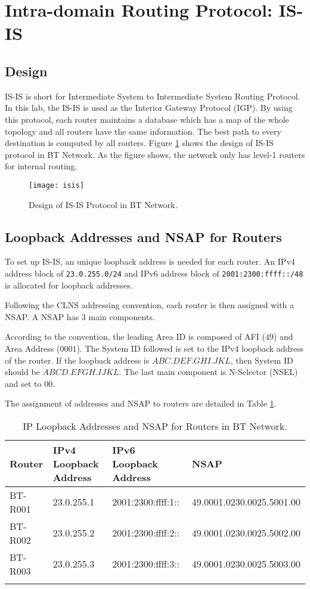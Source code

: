 \section{Intra-domain Routing Protocol: IS-IS}
\label{sec:isis}

\subsection{Design}

IS-IS is short for Intermediate System to Intermediate System Routing Protocol. In this lab, the IS-IS is used as the Interior Gateway Protocol (IGP). 
By using this protocol, each router maintains a database which has a map of the whole topology and all routers have the same information. The best path to every destination is computed by all routers. 
Figure \ref{fig:isis} shows the design of IS-IS protocol in BT Network. As the figure shows, the network only has level-1 routers for internal routing.

\begin{figure}[ht!]
    \centering
    \texttt{[image: isis]}
    \caption{Design of IS-IS Protocol in BT Network.}
    \label{fig:isis}
\end{figure}

\subsection{Loopback Addresses and NSAP for Routers}

To set up IS-IS, an unique loopback address is needed for each router. 
An IPv4 address block of \texttt{23.0.255.0/24} and IPv6 address block of \texttt{2001:2300:ffff::/48} is allocated for loopback addresses. 

Following the CLNS addressing convention, each router is then assigned with a NSAP. A NSAP has $3$ main components. 

According to the convention, the leading Area ID is composed of AFI ($49$) and Area Address ($0001$). 
The System ID followed is set to the IPv4 loopback address of the router. If the loopback address is $ABC.DEF.GHI.JKL$, then System ID should be $ABCD.EFGH.IJKL$.
The last main component is N-Selector (NSEL) and set to $00$.

The assignment of addresses and NSAP to routers are detailed in Table \ref{tab:isis}.

\begin{longtable}[]{@{}llll@{}}
\toprule
Router & IPv4 Loopback Address & IPv6 Loopback Address & NSAP\tabularnewline
\midrule
\endhead
BT-R001 & 23.0.255.1 & 2001:2300:ffff:1:: & 49.0001.0230.0025.5001.00\tabularnewline
BT-R002 & 23.0.255.2 & 2001:2300:ffff:2:: & 49.0001.0230.0025.5002.00\tabularnewline
BT-R003 & 23.0.255.3 & 2001:2300:ffff:3:: & 49.0001.0230.0025.5003.00\tabularnewline
\bottomrule
\caption{IP Loopback Addresses and NSAP for Routers in BT Network.}
\label{tab:isis}
\end{longtable}



